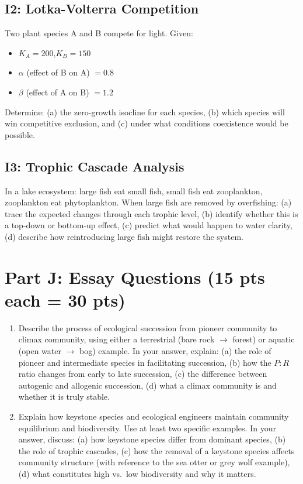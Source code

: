 \documentclass[11pt]{article}
\begin{document}
\subsection*{I2: Lotka-Volterra Competition}
Two plant species A and B compete for light. Given:
\begin{itemize}
  \item $K_A = 200$,\quad $K_B = 150$
  \item $\alpha$ (effect of B on A) $= 0.8$
  \item $\beta$ (effect of A on B) $= 1.2$
\end{itemize}
Determine: (a) the zero-growth isocline for each species, (b) which species will win competitive exclusion, and (c) under what conditions coexistence would be possible.
\vspace{5cm}

\subsection*{I3: Trophic Cascade Analysis}
In a lake ecosystem: large fish eat small fish, small fish eat zooplankton, zooplankton eat phytoplankton. When large fish are removed by overfishing: (a) trace the expected changes through each trophic level, (b) identify whether this is a top-down or bottom-up effect, (c) predict what would happen to water clarity, (d) describe how reintroducing large fish might restore the system.
\vspace{5cm}

\clearpage

\section*{Part J: Essay Questions (15 pts each = 30 pts)}

\begin{enumerate}[label=\textbf{\arabic*.}]
  \item Describe the process of ecological succession from pioneer community to climax community, using either a terrestrial (bare rock $\rightarrow$ forest) or aquatic (open water $\rightarrow$ bog) example. In your answer, explain: (a) the role of pioneer and intermediate species in facilitating succession, (b) how the $P\!:\!R$ ratio changes from early to late succession, (c) the difference between autogenic and allogenic succession, (d) what a climax community is and whether it is truly stable.
  \vspace{5cm}

  \item Explain how keystone species and ecological engineers maintain community equilibrium and biodiversity. Use at least two specific examples. In your answer, discuss: (a) how keystone species differ from dominant species, (b) the role of trophic cascades, (c) how the removal of a keystone species affects community structure (with reference to the sea otter or grey wolf example), (d) what constitutes high vs.\ low biodiversity and why it matters.
  \vspace{5cm}
\end{enumerate}
\end{document}
